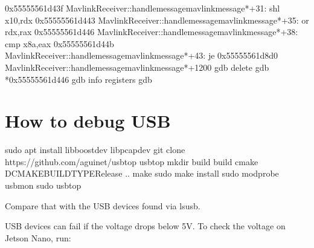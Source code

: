\documentclass[letterpaper,10pt,english]{sphinxmanual}
\begin{document}
\begin{sphinxVerbatim}[commandchars=\\\{\}]
   0x55555561d43f \PYGZlt{}MavlinkReceiver::handle\PYGZus{}message\PYGZus{}\PYGZus{}mavlink\PYGZus{}message*+31\PYGZgt{}:     shl    x10,\PYGZpc{}rdx
   0x55555561d443 \PYGZlt{}MavlinkReceiver::handle\PYGZus{}message\PYGZus{}\PYGZus{}mavlink\PYGZus{}message*+35\PYGZgt{}:     or     \PYGZpc{}rdx,\PYGZpc{}rax
   0x55555561d446 \PYGZlt{}MavlinkReceiver::handle\PYGZus{}message\PYGZus{}\PYGZus{}mavlink\PYGZus{}message*+38\PYGZgt{}:     cmp    x8a,\PYGZpc{}eax
   0x55555561d44b \PYGZlt{}MavlinkReceiver::handle\PYGZus{}message\PYGZus{}\PYGZus{}mavlink\PYGZus{}message*+43\PYGZgt{}:     je     0x55555561d8d0 \PYGZlt{}MavlinkReceiver::handle\PYGZus{}message\PYGZus{}\PYGZus{}mavlink\PYGZus{}message*+1200\PYGZgt{}
gdb delete
gdb  *0x55555561d446    
gdb info registers 
gdb 
\end{sphinxVerbatim}


\section{How to debug USB}
\label{\detokenize{source/howtos/debug_usb:how-to-debug-usb}}\label{\detokenize{source/howtos/debug_usb::doc}}
\begin{sphinxVerbatim}[commandchars=\\\{\}]
sudo apt install libboost\PYGZhy{}dev libpcap\PYGZhy{}dev
git clone https://github.com/aguinet/usbtop
 usbtop
mkdir build   build
cmake \PYGZhy{}DCMAKE\PYGZus{}BUILD\PYGZus{}TYPERelease ..
make
sudo make install
sudo modprobe usbmon
sudo usbtop
\end{sphinxVerbatim}

Compare that with the USB devices found via lsusb.

USB devices can fail if the voltage drops below 5V. To check the voltage on Jetson Nano, run:

\begin{sphinxVerbatim}[commandchars=\\\{\}]
 
\end{sphinxVerbatim}
\end{document}
